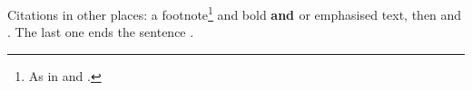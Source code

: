 \documentclass[11pt]{article}
\begin{document}
Citations in other places: a footnote\footnote{As in \citet{x} and \citep[p.~2]{y}.}
and bold \textbf{\citep{x} and \citet{y}} or emphasised \emph{\citealp{x}} text, then
\cite[see][]{x} and \cite[][p.~9]{y}. The last one ends the sentence \citep{z}.


\end{document}
